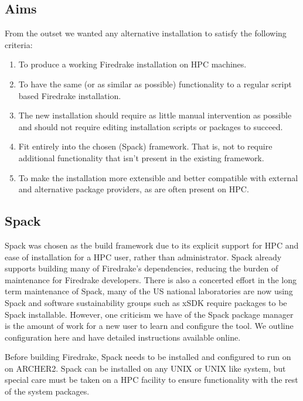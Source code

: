 \documentclass[a4paper,11pt]{article}
\begin{document}
\subsection{Aims}
\label{ssec:spack_aims}
From the outset we wanted any alternative installation to satisfy the following criteria:
\begin{enumerate}[topsep=2pt, partopsep=0pt, itemsep=1pt, parsep=1pt]
	\item To produce a working Firedrake installation on HPC machines.
	\item To have the same (or as similar as possible) functionality to a regular script based Firedrake installation.
	\item The new installation should require as little manual intervention as possible and should not require editing installation scripts or packages to succeed.
	\item Fit entirely into the chosen (Spack) framework. That is, not to require additional functionality that isn't present in the existing framework.
	\item To make the installation more extensible and better compatible with external and alternative package providers, as are often present on HPC.
\end{enumerate}

\subsection{Spack}
\label{ssec:spack}
Spack was chosen as the build framework due to its explicit support for HPC and ease of installation for a HPC user, rather than administrator.
Spack already supports building many of Firedrake's dependencies, reducing the burden of maintenance for Firedrake developers.
There is also a concerted effort in the long term maintenance of Spack, many of the US national laboratories are now using Spack and software sustainability groups such as xSDK\cite{xSDK1,xSDK2} require packages to be Spack installable.
However, one criticism we have of the Spack package manager is the amount of work for a new user to learn and configure the tool.
We outline configuration here and have detailed instructions available online\cite{hackmdinstructionsweb,firedrakewiki}.

Before building Firedrake, Spack needs to be installed and configured to run on on ARCHER2.
Spack can be installed on any UNIX or UNIX like system, but special care must be taken on a HPC facility to ensure functionality with the rest of the system packages.
\end{document}
